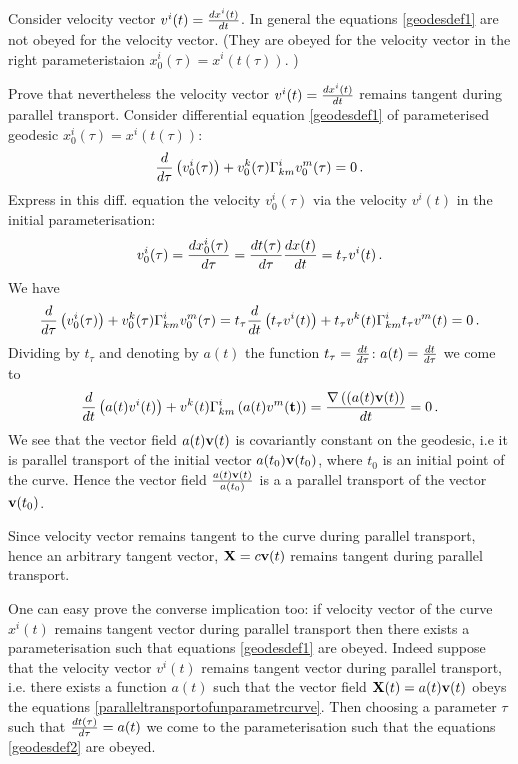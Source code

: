 \documentclass[12pt]{article}
\theoremstyle{theorem}
\numberwithin{equation}{section}
\begin{document}
{Consider velocity vector $v^i(t)={dx^i(t)\over dt}$. In general the equations \eqref{geodesdef1}
are not obeyed for the velocity vector. (They are obeyed for the velocity vector in the right parameteristaion
$x_0^i(\tau)=x^i(t(\tau))$. )

 Prove that nevertheless the velocity vector $v^i(t)={dx^i(t)\over dt}$
 remains tangent during parallel transport.
 Consider differential equation \eqref{geodesdef1} of   parameterised geodesic $x_0^i(\tau)=x^i(t(\tau))$:
                  \begin{equation}\label{geodesdef2}
               {d\over d\tau}\left(v_0^i(\tau)\right)+v_0^k(\tau)\Gamma^i_{km}v_0^m(\tau)=0\,.
                    \end{equation}
Express in this diff. equation the  velocity $v^i_0(\tau)$ via the velocity $v^i(t)$
in the initial parameterisation:
                     $$
v^i_0(\tau)={dx_0^i(\tau)\over d\tau}={dt(\tau)\over d\tau} {dx(t)\over dt}=t_\tau v^i(t)\,.
                    $$
We have
 $$
{d\over d\tau}\left(v_0^i(\tau)\right)+v_0^k(\tau)\Gamma^i_{km}v_0^m(\tau)=
 t_\tau{d\over d t}\left(t_\tau v^i(t)\right)+
 t_\tau v^k(t)\Gamma^i_{km}t_\tau v^m(t)=0\,.
 $$
 Dividing by $t_\tau$ and denoting by $a(t)$ the function $t_\tau={dt\over d\tau}$: $a(t)={dt\over d\tau}$ we come to
       \begin{equation}\label{paralleltransportofunparametrcurve}
 {d\over d t}\left(a(t) v^i(t)\right)+
  v^k(t)\Gamma^i_{km} \left(a(t) v^m({\bf t})\right)={\nabla \left((a(t){\bf v}(t)\right)\over dt}=0\,.
   \end{equation}
  We see that the vector field $a(t){\bf v}(t)$ is covariantly  constant on the  geodesic, i.e it is parallel transport
  of the initial vector $a(t_0){\bf v}(t_0)$, where $t_0$ is an initial point of the curve.
  Hence the vector field  $a(t){\bf v}(t)\over a(t_0)$ is a a parallel transport of the vector ${\bf v}(t_0)$.


Since velocity vector remains tangent to the curve during parallel transport, hence
 an arbitrary tangent vector,  ${\bf X}=c{\bf v}(t)$ remains tangent  during parallel transport.



 \m

 One can easy prove the converse implication too: if velocity vector of the curve $x^i(t)$
remains tangent vector during parallel transport then there exists a parameterisation such
that equations \eqref{geodesdef1} are obeyed.
Indeed suppose that the velocity vector $v^i(t)$ remains tangent vector during parallel transport,
i.e. there exists a function $a(t)$ such that the vector field ${\bf X}(t)=a(t){\bf v}(t)$
obeys the equations \eqref{paralleltransportofunparametrcurve}.  Then choosing a parameter $\tau$
such that ${dt(\tau)\over d\tau}=a(t)$ we come to the parameterisation such that the equations
\eqref{geodesdef2} are obeyed. \finish

}
\end{document}
